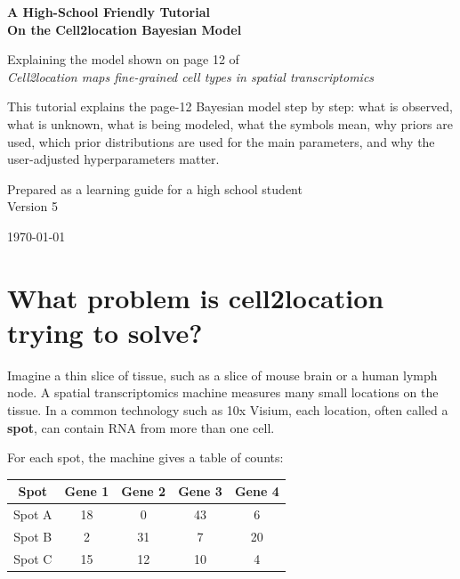 \documentclass[11pt]{article}
\newcommand{\term}[1]{\textbf{#1}}
\begin{document}
\begin{titlepage}
\centering
\vspace*{0.5in}
{\Huge\bfseries A High-School Friendly Tutorial\\[0.3em]
On the Cell2location Bayesian Model\par}
\vspace{0.35in}
{\Large Explaining the model shown on page 12 of\\
\emph{Cell2location maps fine-grained cell types in spatial transcriptomics}\par}
\vspace{0.55in}
\begin{tcolorbox}[colback=softblue,colframe=deepblue,width=0.88\textwidth,arc=2mm]
\large
This tutorial explains the page-12 Bayesian model step by step: what is observed, what is unknown, what is being modeled, what the symbols mean, why priors are used, which prior distributions are used for the main parameters, and why the user-adjusted hyperparameters matter.
\end{tcolorbox}
\vfill
{\large Prepared as a learning guide for a high school student\\Version 5}\par
\vspace{0.3in}
{\large \today}\par
\end{titlepage}

\tableofcontents
\newpage

\section{What problem is cell2location trying to solve?}

Imagine a thin slice of tissue, such as a slice of mouse brain or a human lymph node. A spatial transcriptomics machine measures many small locations on the tissue. In a common technology such as 10x Visium, each location, often called a \term{spot}, can contain RNA from more than one cell.

For each spot, the machine gives a table of counts:

\begin{center}
\begin{tabular}{c|cccc}
\toprule
Spot & Gene 1 & Gene 2 & Gene 3 & Gene 4 \\
\midrule
Spot A & 18 & 0 & 43 & 6 \\
Spot B & 2 & 31 & 7 & 20 \\
Spot C & 15 & 12 & 10 & 4 \\
\bottomrule
\end{tabular}
\end{center}
\end{document}
